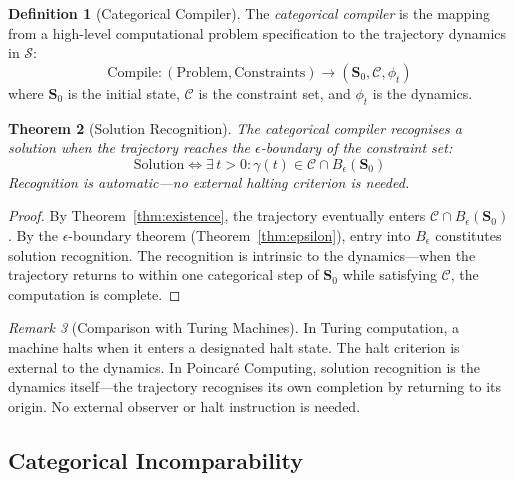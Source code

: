 \documentclass[twocolumn,10pt,a4paper]{article}
\theoremstyle{plain}
\newtheorem{theorem}{Theorem}[section]
\theoremstyle{definition}
\newtheorem{definition}[theorem]{Definition}
\theoremstyle{remark}
\newtheorem{remark}[theorem]{Remark}
\newcommand{\Sspace}{\mathcal{S}}
\newcommand{\Scoord}{\mathbf{S}}
\newcommand{\trajectory}{\gamma}
\begin{document}
\begin{definition}[Categorical Compiler]
\label{def:compiler}
The \emph{categorical compiler} is the mapping from a high-level computational problem specification to the trajectory dynamics in $\Sspace$:
\begin{equation}
    \mathrm{Compile} : (\text{Problem}, \text{Constraints}) \to (\Scoord_0, \mathcal{C}, \phi_t)
\end{equation}
where $\Scoord_0$ is the initial state, $\mathcal{C}$ is the constraint set, and $\phi_t$ is the dynamics.
\end{definition}

\begin{theorem}[Solution Recognition]
\label{thm:recognition}
The categorical compiler recognises a solution when the trajectory reaches the $\epsilon$-boundary of the constraint set:
\begin{equation}
    \text{Solution} \iff \exists\, t > 0 : \trajectory(t) \in \mathcal{C} \cap B_\epsilon(\Scoord_0)
\end{equation}
Recognition is automatic---no external halting criterion is needed.
\end{theorem}

\begin{proof}
By Theorem~\ref{thm:existence}, the trajectory eventually enters $\mathcal{C} \cap B_\epsilon(\Scoord_0)$. By the $\epsilon$-boundary theorem (Theorem~\ref{thm:epsilon}), entry into $B_\epsilon$ constitutes solution recognition. The recognition is intrinsic to the dynamics---when the trajectory returns to within one categorical step of $\Scoord_0$ while satisfying $\mathcal{C}$, the computation is complete.
\end{proof}

\begin{remark}[Comparison with Turing Machines]
In Turing computation, a machine halts when it enters a designated halt state. The halt criterion is external to the dynamics. In Poincar\'{e} Computing, solution recognition is the dynamics itself---the trajectory recognises its own completion by returning to its origin. No external observer or halt instruction is needed.
\end{remark}

\subsection{Categorical Incomparability}
\end{document}
